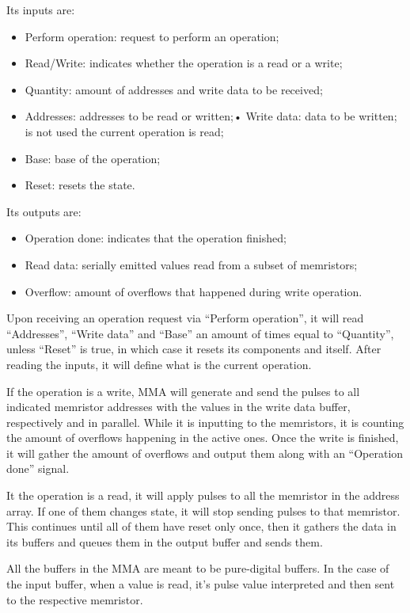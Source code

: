 \documentclass[ecp,tc,english]{iiufrgs}
\begin{document}
Its inputs are:

\begin{itemize}
    \item Perform operation: request to perform an operation;
    \item Read/Write: indicates whether the operation is a read or a write;
    \item Quantity: amount of addresses and write data to be received;
    \item Addresses: addresses to be read or written;• Write data: data to be written; is not used the current operation is read;
    \item Base: base of the operation;
    \item Reset: resets the state.
\end{itemize}

Its outputs are:

\begin{itemize}
    \item Operation done: indicates that the operation finished;
    \item Read data: serially emitted values read from a subset of memristors;
    \item Overflow: amount of overflows that happened during write operation.
\end{itemize}

Upon receiving an operation request via “Perform operation”, it will read “Addresses”, “Write data” and “Base” an amount of times equal to “Quantity”, unless “Reset” is true, in which case it resets its components and itself. After reading the inputs, it will define what is the current operation.

If the operation is a write, MMA will generate and send the pulses to all indicated memristor addresses with the values in the write data buffer, respectively and in parallel. While it is inputting to the memristors, it is counting the amount of overflows happening in the active ones. Once the write is finished, it will gather the amount of overflows and output them along with an “Operation done” signal.

It the operation is a read, it will apply pulses to all the memristor in the address array. If one of them changes state, it will stop sending pulses to that memristor. This continues until all of them have reset only once, then it gathers the data in its buffers and queues them in the output buffer and sends them.

All the buffers in the MMA are meant to be pure-digital buffers. In the case of the input buffer, when a value is read, it's pulse value interpreted and then sent to the respective memristor.
\end{document}
